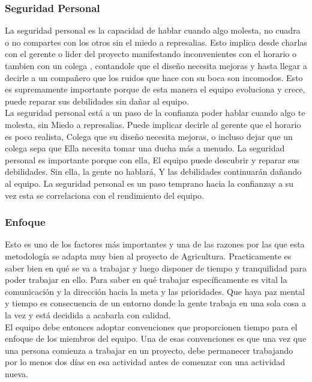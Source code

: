 \subsubsection{Seguridad Personal}
La seguridad personal es la capacidad de hablar cuando algo molesta, no cuadra o no compartes con los otros sin el miedo a represalias. Esto implica desde charlas con el gerente o lider del proyecto manifestando inconvenientes con el horario o tambien con un colega , contandole que el diseño necesita mejoras y hasta llegar a decirle a un compañero que los ruidos que hace con su boca son incomodos. Esto es supremamente importante porque de esta manera el equipo evoluciona y crece, puede reparar sus debilidades sin dañar al equipo.\\

 La seguridad personal está a un paso de la confianza poder hablar cuando algo te molesta, sin
Miedo a represalias. Puede implicar decirle al gerente que el horario es poco realista,
Colega que su diseño necesita mejoras, o incluso dejar que un colega sepa que
Ella necesita tomar una ducha más a menudo. La seguridad personal es importante porque con ella,
El equipo puede descubrir y reparar sus debilidades. Sin ella, la gente no hablará,
Y las debilidades continuarán dañando al equipo.
La seguridad personal es un paso temprano hacia la confianzay a su vez esta se correlaciona con el rendimiento del equipo.
\subsubsection{Enfoque}
Esto es uno de los factores más importantes y una de las razones por las que esta metodología se adapta muy bien al proyecto de Agricultura. Practicamente es saber bien en qué se va a trabajar y luego disponer de tiempo y tranquilidad para poder trabajar en ello. Para saber en qué trabajar específicamente es vital la comunicación y la dirección hacia la meta y las prioridades. Que haya paz mental y tiempo es consecuencia de un entorno donde la gente trabaja en una sola cosa a la vez y está decidida a acabarla con calidad.\\

El equipo debe entonces adoptar convenciones que proporcionen tiempo para el enfoque de los miembros del equipo. Una de esas convenciones es que una vez que una persona comienza a trabajar en un proyecto, debe permanecer trabajando por lo menos dos días en esa actividad antes de comenzar con una actividad nueva.\\

